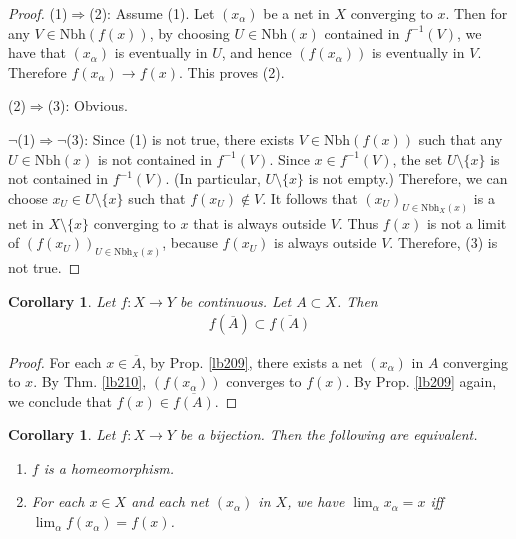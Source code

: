 \documentclass[12pt,b5paper,notitlepage]{article}
\theoremstyle{definition}
\theoremstyle{plain}
\newtheorem{co}[df]{Corollary}
\newcommand{\ovl}{\overline}
\newcommand{\Nbh}{\mathrm{Nbh}}
\numberwithin{equation}{section}
\begin{document}
\begin{proof}
(1)$\Rightarrow$(2): Assume (1). Let $(x_\alpha)$ be a net in $X$ converging to $x$. Then for any $V\in\Nbh(f(x))$, by choosing $U\in\Nbh(x)$ contained in $f^{-1}(V)$, we have that $(x_\alpha)$ is eventually in $U$, and hence $(f(x_\alpha))$ is eventually in $V$. Therefore $f(x_\alpha)\rightarrow f(x)$. This proves (2).

(2)$\Rightarrow$(3): Obvious.

$\neg$(1)$\Rightarrow$$\neg$(3): %
Since (1) is not true, there exists $V\in\Nbh(f(x))$ such that any $U\in\Nbh(x)$ is not contained in $f^{-1}(V)$. Since $x\in f^{-1}(V)$, the set $U\setminus\{x\}$ is not contained in $f^{-1}(V)$. (In particular, $U\setminus\{x\}$ is not empty.) Therefore, we can choose $x_U\in U\setminus\{x\}$ such that $f(x_U)\notin V$. It follows that $(x_U)_{U\in\Nbh_X(x)}$ is a net in $X\setminus\{x\}$ converging to $x$ that is always outside $V$. Thus $f(x)$ is not a limit of $(f(x_U))_{U\in\Nbh_X(x)}$, because $f(x_U)$ is always outside $V$. Therefore, (3) is not true.
\end{proof}


\begin{co}\label{lb325}
Let $f:X\rightarrow Y$ be continuous. Let $A\subset X$. Then
\begin{align*}
f(\ovl A)\subset \ovl{f(A)}
\end{align*}
\end{co}

\begin{proof}
For each $x\in\ovl A$, by Prop. \ref{lb209}, there exists a net $(x_\alpha)$ in $A$ converging to $x$. By Thm. \ref{lb210}, $(f(x_\alpha))$ converges to $f(x)$. By Prop. \ref{lb209} again, we conclude that $f(x)\in\ovl{f(A)}$.
\end{proof}


\begin{co}\label{lb211}
Let $f:X\rightarrow Y$ be a bijection. Then the following are equivalent.
\begin{enumerate}
\item[(1)] $f$ is a homeomorphism.
\item[(2)] For each $x\in X$ and each net $(x_\alpha)$ in $X$, we have $\lim_\alpha x_\alpha=x$ iff $\lim_\alpha f(x_\alpha)=f(x)$. 
\end{enumerate}
\end{co}
\end{document}
